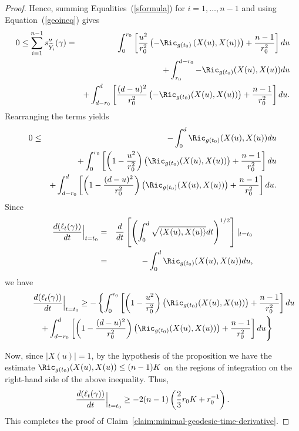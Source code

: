 \begin{proof}
Hence, summing Equalities~(\ref{sformula}) for $i=1,\ldots, n-1$ and
using Equation~(\ref{geoineq}) gives
\begin{eqnarray*}
0\le\sum_{i=1}^{n-1}s''_{\widetilde Y_i}(\gamma) & = &
\int_0^{r_0}\left[\frac{u^2}{r_0^2}\left(-\Ric_{g(t_0)}\left(X(u),X(u)\right)\right)
+\frac{n-1}{r_0^2}\right]du
\\
& & + \int_{r_0}^{d-r_0}-\Ric_{g(t_0)}(X(u),X(u))du
\\
 & & +\int_{d-r_0}^d\left[\frac{(d-u)^2}{r_0^2}
\left(-\Ric_{g(t_0)}(X(u),X(u))\right)+\frac{n-1}{r_0^2}\right]du.\end{eqnarray*}
Rearranging the terms yields
\begin{eqnarray*} 0 & \le & -\int_0^d \Ric_{g(t_0)}(X(u),X(u))du \\
& &+\int_0^{r_0}\left[\left(1-\frac{u^2}{r_0^2}\right)
\left(\Ric_{g(t_0)}(X(u),X(u))\right) +\frac{n-1}{r_0^2}\right]du\\
& & +\int_{d-r_0}^d
\left[\left(1-\frac{(d-u)^2}{r_0^2}\right)\left(\Ric_{g(t_0)}(X(u),X(u))\right)
+\frac{n-1}{r_0^2}\right]du.
\end{eqnarray*}
Since
\begin{eqnarray*}
\frac{d(\ell_t(\gamma))}{dt}\Bigl|_{t=t_0}\Bigr. & = &
\frac{d}{dt}\left[\left(\int_0^d\sqrt{\langle X(u),X(u)\rangle}dt\right)^{1/2}\right]|_{t=t_0} \\
& = & -\int_0^d \Ric_{g(t_0)}(X(u),X(u))du,
\end{eqnarray*}
we have
\begin{eqnarray*}
\lefteqn{\frac{d(\ell_t(\gamma))}{dt}\Bigl|_{t=t_0}\Bigr.\ge
-\left\{\int_0^{r_0}\left[\left(1-\frac{u^2}{r_0^2}\right)\left(\Ric_{g(t_0)}(X(u),X(u))\right)
+\frac{n-1}{r_0^2}\right]du\right.}
\\
& & \left. +\int_{d-r_0}^d
\left[\left(1-\frac{(d-u)^2}{r_0^2}\right)\left(\Ric_{g(t_0)}(X(u),X(u))\right)
+\frac{n-1}{r_0^2}\right]du\right\}
\end{eqnarray*}


Now, since $|X(u)|=1$, by the hypothesis of the proposition we have
the estimate $\Ric_{g(t_0)}(X(u),X(u))\le (n-1)K$ on the regions of
integration on the right-hand side of the above inequality. Thus,
\begin{eqnarray*}
\frac{d(\ell_t(\gamma))}{dt}\Bigl|_{t=t_0}\Bigr.\ge
-2(n-1)\left(\frac{2}{3}r_0K+r_0^{-1}\right).
\end{eqnarray*}
This completes the proof of Claim~\ref{claim:minimal-geodesic-time-derivative}.
\end{proof}

